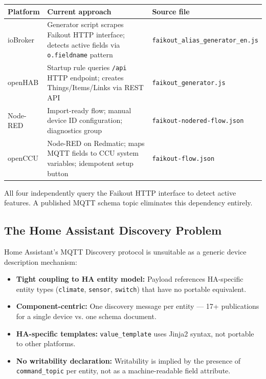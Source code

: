 \documentclass[11pt,a4paper]{article}
\begin{document}
\vspace{4pt}
\begin{tabularx}{\textwidth}{@{}lLl@{}}
\toprule
\textbf{Platform} & \textbf{Current approach} & \textbf{Source file} \\
\midrule
{}
ioBroker & Generator script scrapes Faikout HTTP interface; detects active fields via \texttt{o.fieldname} pattern & \texttt{faikout\_alias\_generator\_en.js} \\
openHAB & Startup rule queries \texttt{/api} HTTP endpoint; creates Things/Items/Links via REST API & \texttt{faikout\_generator.js} \\
Node-RED & Import-ready flow; manual device ID configuration; diagnostics group & \texttt{faikout-nodered-flow.json} \\
openCCU & Node-RED on Redmatic; maps MQTT fields to CCU system variables; idempotent setup button & \texttt{faikout-flow.json} \\
\bottomrule
\end{tabularx}
\vspace{4pt}

All four independently query the Faikout HTTP interface to detect active features. A published MQTT schema topic eliminates this dependency entirely.

\subsection{The Home Assistant Discovery Problem}

Home Assistant's MQTT Discovery protocol is unsuitable as a generic device description mechanism:

\begin{itemize}[noitemsep]
  \item \textbf{Tight coupling to HA entity model:} Payload references HA-specific entity types (\texttt{climate}, \texttt{sensor}, \texttt{switch}) that have no portable equivalent.
  \item \textbf{Component-centric:} One discovery message per entity — 17+ publications for a single device vs. one schema document.
  \item \textbf{HA-specific templates:} \texttt{value\_template} uses Jinja2 syntax, not portable to other platforms.
  \item \textbf{No writability declaration:} Writability is implied by the presence of \texttt{command\_topic} per entity, not as a machine-readable field attribute.
\end{itemize}
\end{document}
